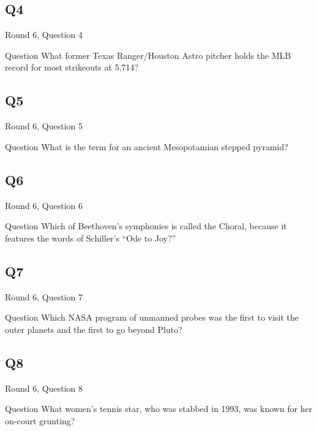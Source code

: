 \documentclass[11pt]{beamer}
\begin{document}
\subsection*{Q4}
\begin{frame}[t]{Round 6, Question 4}
\vspace{2em}
\begin{block}{Question}
What former Texas Ranger/Houston Astro pitcher holds the MLB record for most strikeouts at 5,714\@?
\end{block}
\end{frame}
    

\subsection*{Q5}
\begin{frame}[t]{Round 6, Question 5}
\vspace{2em}
\begin{block}{Question}
What is the term for an ancient Mesopotamian stepped pyramid\@?
\end{block}
\end{frame}
    

\subsection*{Q6}
\begin{frame}[t]{Round 6, Question 6}
\vspace{2em}
\begin{block}{Question}
Which of Beethoven's symphonies is called the Choral, because it features the words of Schiller's ``Ode to Joy?''
\end{block}
\end{frame}
    

\subsection*{Q7}
\begin{frame}[t]{Round 6, Question 7}
\vspace{2em}
\begin{block}{Question}
Which NASA program of unmanned probes was the first to visit the outer planets and the first to go beyond Pluto\@?
\end{block}
\end{frame}
    

\subsection*{Q8}
\begin{frame}[t]{Round 6, Question 8}
\vspace{2em}
\begin{block}{Question}
What women's tennis star, who was stabbed in 1993, was known for her on-court grunting\@?
\end{block}
\end{frame}
    
\end{document}
